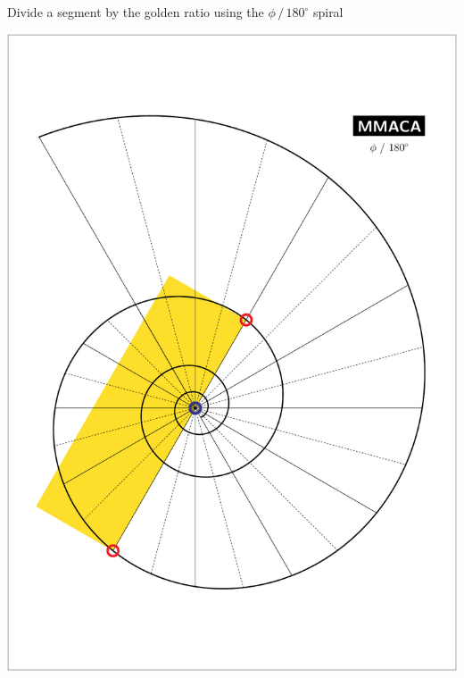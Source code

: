 \documentclass[a4paper,12pt]{article}
\begin{document}
    \begin{center}
    
        \large

        Divide a segment by the golden ratio using the $\phi \, / \, 180^{\circ}$ spiral

        \bigskip \bigskip \bigskip
    
        \includegraphics[scale=0.7071]{./pictures/Example_10}

    \end{center}

    \newpage

\end{document}
